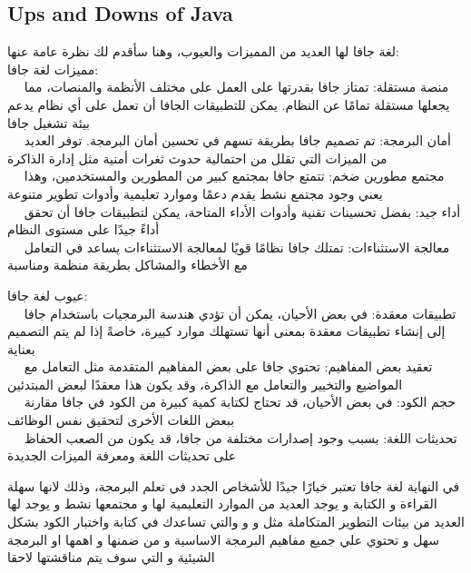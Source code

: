   \subsection{Ups and Downs of Java }
  \begin{AR}
    لغة جافا لها العديد من المميزات والعيوب، وهنا سأقدم لك نظرة عامة عنها:
\\
    مميزات لغة جافا:
\\  
\ \ \LR{\textcolor{theme}{- 1}}    منصة مستقلة: تمتاز جافا بقدرتها على العمل على مختلف الأنظمة والمنصات، مما يجعلها مستقلة تمامًا عن النظام. يمكن للتطبيقات الجافا أن تعمل على أي نظام يدعم بيئة تشغيل جافا  
\\ 
\ \ \LR{\textcolor{theme}{- 2}}    أمان البرمجة: تم تصميم جافا بطريقة تسهم في تحسين أمان البرمجة. توفر العديد من الميزات التي تقلل من احتمالية حدوث ثغرات أمنية مثل إدارة الذاكرة
\\ 
\ \ \LR{\textcolor{theme}{- 3}}    مجتمع مطورين ضخم: تتمتع جافا بمجتمع كبير من المطورين والمستخدمين، وهذا يعني وجود مجتمع نشط يقدم دعمًا وموارد تعليمية وأدوات تطوير متنوعة
\\ 
\ \ \LR{\textcolor{theme}{- 4}}    أداء جيد: بفضل تحسينات تقنية  وأدوات الأداء المتاحة، يمكن لتطبيقات جافا أن تحقق أداءً جيدًا على مستوى النظام
\\ 
\ \ \LR{\textcolor{theme}{- 5}}    معالجة الاستثناءات: تمتلك جافا نظامًا قويًا لمعالجة الاستثناءات يساعد في التعامل مع الأخطاء والمشاكل بطريقة منظمة ومناسبة

    عيوب لغة جافا:
\\
\ \ \LR{\textcolor{theme}{- 1}}    تطبيقات معقدة: في بعض الأحيان، يمكن أن تؤدي هندسة البرمجيات باستخدام جافا إلى إنشاء تطبيقات معقدة \LR{)}بمعنى أنها تستهلك موارد كبيرة\LR{(}، خاصةً إذا لم يتم التصميم بعناية  
\\
\ \ \LR{\textcolor{theme}{- 2}}    تعقيد بعض المفاهيم: تحتوي جافا على بعض المفاهيم المتقدمة مثل التعامل مع المواضيع والتخيير  والتعامل مع الذاكرة، وقد يكون هذا معقدًا لبعض المبتدئين
\\
\ \ \LR{\textcolor{theme}{- 3}}    حجم الكود: في بعض الأحيان، قد تحتاج لكتابة كمية كبيرة من الكود في جافا مقارنة ببعض اللغات الأخرى لتحقيق نفس الوظائف
\\
\ \ \LR{\textcolor{theme}{- 4}}    تحديثات اللغة: بسبب وجود إصدارات مختلفة من جافا، قد يكون من الصعب الحفاظ على تحديثات اللغة ومعرفة الميزات الجديدة 
  
    في النهاية لغة جافا تعتبر خيارًا جيدًا للأشخاص الجدد في تعلم البرمجة، وذلك لانها
    سهلة القراءة و الكتابة و يوجد العديد من الموارد التعليمية لها 
    و مجتمعها نشط و يوجد لها العديد من بيئات التطوير المتكاملة 
     مثل  و و والتي تساعدك في كتابة واختبار الكود بشكل سهل
    و تحتوي علي جميع مفاهيم البرمجة الاساسية و من ضمنها و اهمها  او البرمجة الشيئية و التي سوف يتم مناقشتها لاحقا
  \end{AR}
